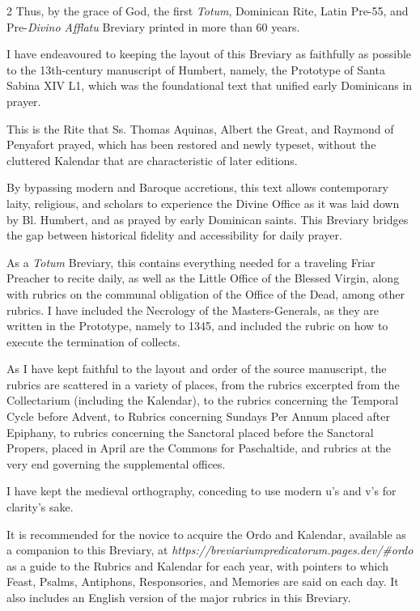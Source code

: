 \begin{multicols*}{2}
Thus, by the grace of God, the first \emph{Totum}, Dominican Rite, Latin Pre-55, and Pre-\textit{Divino Afflatu} Breviary printed in more than 60 years.

I have endeavoured to keeping the layout of this Breviary as faithfully as possible to the 13th-century manuscript of Humbert, namely, the Prototype of Santa Sabina XIV L1, which was the foundational text that unified early Dominicans in prayer.

This is the Rite that Ss. Thomas Aquinas, Albert the Great, and Raymond of Penyafort prayed, which has been restored and newly typeset, without the cluttered Kalendar that are characteristic of later editions.

By bypassing modern and Baroque accretions, this text allows contemporary laity, religious, and scholars to experience the Divine Office as it was laid down by Bl. Humbert, and as prayed by early Dominican saints. This Breviary bridges the gap between historical fidelity and accessibility for daily prayer.




{\color{Red} }


As a \emph{Totum} Breviary, this contains everything needed for a traveling Friar Preacher to recite daily, as well as the Little Office of the Blessed Virgin, along with rubrics on the communal obligation of the Office of the Dead, among other rubrics. I have included the Necrology of the Masters-Generals, as they are written in the Prototype, namely to 1345, and included the rubric on how to execute the termination of collects.

As I have kept faithful to the layout and order of the source manuscript, the rubrics are scattered in a variety of places, from the rubrics excerpted from the Collectarium (including the Kalendar), to the rubrics concerning the Temporal Cycle before Advent, to Rubrics concerning Sundays Per Annum placed after Epiphany, to rubrics concerning the Sanctoral placed before the Sanctoral Propers, placed in April are the Commons for Paschaltide, and rubrics at the very end governing the supplemental offices.

I have kept the medieval orthography, conceding to use modern u's and v's for clarity's sake.

It is recommended for the novice to acquire the Ordo and Kalendar, available as a companion to this Breviary, at \textit{https://breviariumpredicatorum.pages.dev/\#ordo} as a guide to the Rubrics and Kalendar for each year, with pointers to which Feast, Psalms, Antiphons, Responsories, and Memories are said on each day. It also includes an English version of the major rubrics in this Breviary.


\end{multicols*}

